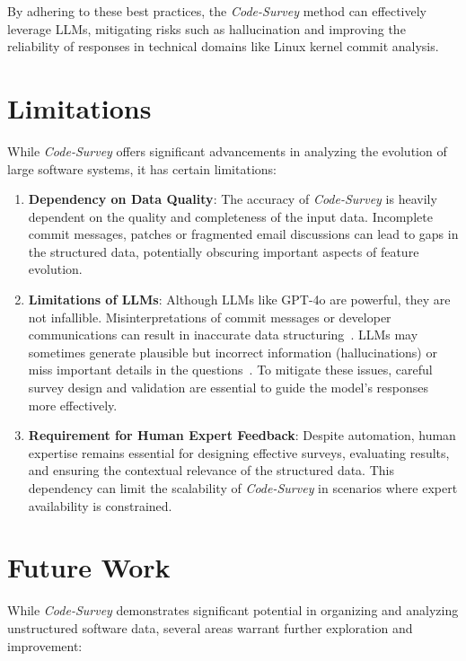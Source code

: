 By adhering to these best practices, the \emph{Code-Survey} method can effectively leverage LLMs, mitigating risks such as hallucination and improving the reliability of responses in technical domains like Linux kernel commit analysis.

\section{Limitations}
\label{sec:limitations}

While \emph{Code-Survey} offers significant advancements in analyzing the evolution of large software systems, it has certain limitations:

\begin{enumerate}
    \item \textbf{Dependency on Data Quality}: The accuracy of \emph{Code-Survey} is heavily dependent on the quality and completeness of the input data. Incomplete commit messages, patches or fragmented email discussions can lead to gaps in the structured data, potentially obscuring important aspects of feature evolution.

    \item \textbf{Limitations of LLMs}: Although LLMs like GPT-4o are powerful, they are not infallible. Misinterpretations of commit messages or developer communications can result in inaccurate data structuring~\cite{ji2023survey}. LLMs may sometimes generate plausible but incorrect information (hallucinations) or miss important details in the questions~\cite{bubeck2023sparks}. To mitigate these issues, careful survey design and validation are essential to guide the model's responses more effectively.

    \item \textbf{Requirement for Human Expert Feedback}: Despite automation, human expertise remains essential for designing effective surveys, evaluating results, and ensuring the contextual relevance of the structured data. This dependency can limit the scalability of \emph{Code-Survey} in scenarios where expert availability is constrained.
\end{enumerate}

\section{Future Work}
\label{sec:future}

While \emph{Code-Survey} demonstrates significant potential in organizing and analyzing unstructured software data, several areas warrant further exploration and improvement:

